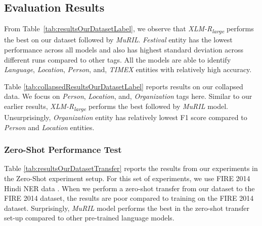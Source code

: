 \documentclass[10pt, a4paper]{article}
\begin{document}
\subsection{Evaluation Results}

From Table~\ref{tab:resultsOurDatasetLabel}, we observe that \textit{XLM-R\textsubscript{large}} performs the best on our dataset followed by \textit{MuRIL}. \textit{Festival} entity has the lowest performance across all models and also has highest standard deviation across different runs compared to other tags. All the models are able to identify \textit{Language}, \textit{Location}, \textit{Person}, and, \textit{TIMEX} entities with relatively high accuracy.

Table \ref{tab:collapsedResultsOurDatasetLabel} reports results on our collapsed data. We focus on \textit{Person}, \textit{Location}, and, \textit{Organization} tags here. Similar to our earlier results, \textit{XLM-R\textsubscript{large}} performs the best followed by \textit{MuRIL} model. Unsurprisingly, \textit{Organization} entity has relatively lowest F1 score compared to \textit{Person} and \textit{Location} entities.

\subsubsection*{Zero-Shot Performance Test}

Table \ref{tab:resultsOurDatasetTransfer} reports the results from our experiments in the Zero-Shot experiment setup. For this set of experiments, we use FIRE 2014 Hindi NER data \cite{FIRE2014}. When we perform a zero-shot transfer from our dataset to the FIRE 2014 dataset, the results are poor compared to training on the FIRE 2014 dataset. Surprisingly, \textit{MuRIL} model performs the best in the zero-shot transfer set-up compared to other pre-trained language models. 
\end{document}
